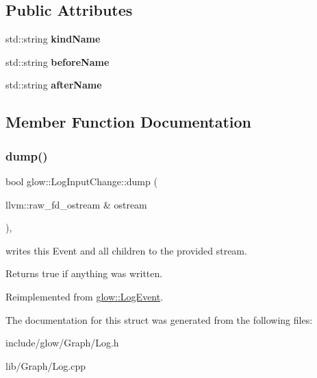 \subsection*{Public Attributes}
\begin{DoxyCompactItemize}
\item 
\mbox{\label{structglow_1_1_log_input_change_a40fb083a01a81d1464eb2ca7d9037dd5}} 
std\+::string {\bfseries kind\+Name}
\item 
\mbox{\label{structglow_1_1_log_input_change_afed9af06766e5a17efa7b9d4b4488d9c}} 
std\+::string {\bfseries before\+Name}
\item 
\mbox{\label{structglow_1_1_log_input_change_a62063203e1eed419abe881d557303f0f}} 
std\+::string {\bfseries after\+Name}
\end{DoxyCompactItemize}


\subsection{Member Function Documentation}
\mbox{\label{structglow_1_1_log_input_change_abe24dc999f25edf277ec308940827431}} 
\subsubsection{\texorpdfstring{dump()}{dump()}}
{\footnotesize\ttfamily bool glow\+::\+Log\+Input\+Change\+::dump (\begin{DoxyParamCaption}\item[{llvm\+::raw\+\_\+fd\+\_\+ostream \&}]{ostream }\end{DoxyParamCaption})\hspace{0.3cm}{\ttfamily [override]}, {\ttfamily [virtual]}}

writes this Event and all children to the provided stream. \begin{DoxyReturn}{Returns}
true if anything was written. 
\end{DoxyReturn}


Reimplemented from \hyperlink{structglow_1_1_log_event_a1c25aa690ea65f6b184ba3133fd6c564}{glow\+::\+Log\+Event}.



The documentation for this struct was generated from the following files\+:\begin{DoxyCompactItemize}
\item 
include/glow/\+Graph/Log.\+h\item 
lib/\+Graph/Log.\+cpp\end{DoxyCompactItemize}

